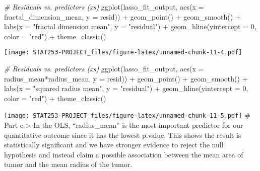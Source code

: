 \documentclass[
]{article}
\newenvironment{Shaded}{\begin{snugshade}}{\end{snugshade}}
\newcommand{\AttributeTok}[1]{\textcolor[rgb]{0.77,0.63,0.00}{#1}}
\newcommand{\CommentTok}[1]{\textcolor[rgb]{0.56,0.35,0.01}{\textit{#1}}}
\newcommand{\DecValTok}[1]{\textcolor[rgb]{0.00,0.00,0.81}{#1}}
\newcommand{\FunctionTok}[1]{\textcolor[rgb]{0.00,0.00,0.00}{#1}}
\newcommand{\NormalTok}[1]{#1}
\newcommand{\SpecialCharTok}[1]{\textcolor[rgb]{0.00,0.00,0.00}{#1}}
\newcommand{\StringTok}[1]{\textcolor[rgb]{0.31,0.60,0.02}{#1}}
\begin{document}
\begin{Shaded}
\begin{Highlighting}[]
\CommentTok{\# Residuals vs. predictors (x\textquotesingle{}s) }
\FunctionTok{ggplot}\NormalTok{(lasso\_fit\_output, }\FunctionTok{aes}\NormalTok{(}\AttributeTok{x =}\NormalTok{ fractal\_dimension\_mean, }\AttributeTok{y =}\NormalTok{ resid)) }\SpecialCharTok{+}
  \FunctionTok{geom\_point}\NormalTok{() }\SpecialCharTok{+}
  \FunctionTok{geom\_smooth}\NormalTok{() }\SpecialCharTok{+}
  \FunctionTok{labs}\NormalTok{(}\AttributeTok{x =} \StringTok{"fractal dimension mean"}\NormalTok{, }\AttributeTok{y =} \StringTok{"residual"}\NormalTok{) }\SpecialCharTok{+}
  \FunctionTok{geom\_hline}\NormalTok{(}\AttributeTok{yintercept =} \DecValTok{0}\NormalTok{, }\AttributeTok{color =} \StringTok{"red"}\NormalTok{) }\SpecialCharTok{+}
  \FunctionTok{theme\_classic}\NormalTok{()}
\end{Highlighting}
\end{Shaded}

\texttt{[image: STAT253-PROJECT\_files/figure-latex/unnamed-chunk-11-4.pdf]}

\begin{Shaded}
\begin{Highlighting}[]
\CommentTok{\# Residuals vs. predictors (x\textquotesingle{}s) }
\FunctionTok{ggplot}\NormalTok{(lasso\_fit\_output, }\FunctionTok{aes}\NormalTok{(}\AttributeTok{x =}\NormalTok{ radius\_mean}\SpecialCharTok{*}\NormalTok{radius\_mean, }\AttributeTok{y =}\NormalTok{ resid)) }\SpecialCharTok{+}
  \FunctionTok{geom\_point}\NormalTok{() }\SpecialCharTok{+}
  \FunctionTok{geom\_smooth}\NormalTok{() }\SpecialCharTok{+}
  \FunctionTok{labs}\NormalTok{(}\AttributeTok{x =} \StringTok{"squared radius mean"}\NormalTok{, }\AttributeTok{y =} \StringTok{"residual"}\NormalTok{) }\SpecialCharTok{+}
  \FunctionTok{geom\_hline}\NormalTok{(}\AttributeTok{yintercept =} \DecValTok{0}\NormalTok{, }\AttributeTok{color =} \StringTok{"red"}\NormalTok{) }\SpecialCharTok{+}
  \FunctionTok{theme\_classic}\NormalTok{()}
\end{Highlighting}
\end{Shaded}

\texttt{[image: STAT253-PROJECT\_files/figure-latex/unnamed-chunk-11-5.pdf]}
\# Part e \textgreater{} In the OLS, ``radius\_mean'' is the most
important predictor for our quantitative outcome since it has the lowest
p.value. This shows the result is statistically significant and we have
stronger evidence to reject the null hypothesis and instead claim a
possible association between the mean area of tumor and the mean radius
of the tumor.
\end{document}

